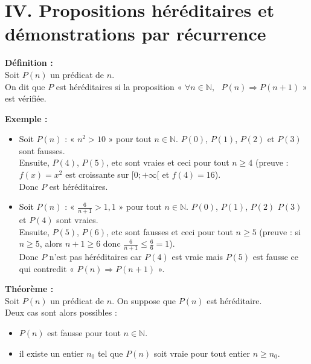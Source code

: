 \documentclass[11pt,a4paper]{article}
\begin{document}
\section*{IV. Propositions héréditaires et démonstrations par récurrence}

\begin{mdframed}[style=definitionStyle]
    \textbf{Définition :} ~\\
    Soit $P(n)$ un prédicat de $n$. \\
    On dit que $P$ est héréditaires si la proposition « $\forall n\in\mathbb{N}, \text{ } P(n)\Rightarrow P(n+1)$ » est vérifiée.	
\end{mdframed}

\textbf{Exemple :}
\begin{itemize}
  \item Soit $P(n)$ : « $n^2>10$ » pour tout $n\in\mathbb{N}$. $P(0)$, $P(1)$, $P(2)$ et $P(3)$ sont fausses. \\
  Ensuite, $P(4)$, $P(5)$, etc sont vraies et ceci pour tout $n\geq4$ (preuve : $f(x)=x^2$ est croissante sur $[0;+\infty[$ et $f(4)=16$).\\
  Donc $P$ est héréditaires.	
  \item Soit $P(n)$ : « $\frac{6}{n+1}>1,1$ » pour tout $n\in\mathbb{N}$. $P(0)$, $P(1)$, $P(2)$ $P(3)$ et $P(4)$ sont vraies.\\
  Ensuite, $P(5)$, $P(6)$, etc sont fausses et ceci pour tout $n\geq5$ (preuve : si $n\geq5$, alors $n+1\geq6$ donc $\frac{6}{n+1}\leq\frac{6}{6}=1$).\\
  Donc $P$ n'est pas héréditaires car $P(4)$ est vraie mais $P(5)$ est fausse ce qui contredit « $P(n)\Rightarrow P(n+1)$ ».
\end{itemize}

\begin{mdframed}[style=proprieteStyle]
    \textbf{Théorème :} ~\\
    Soit $P(n)$ un prédicat de $n$. On suppose que $P(n)$ est héréditaire.\\
    Deux cas sont alors possibles :
    \vspace{-4pt}
    \begin{itemize}
      \item $P(n)$ est fausse pour tout $n\in\mathbb{N}$.
      \item il existe un entier $n_0$ tel que $P(n)$ soit vraie pour tout entier $n\geq n_0$.
    \end{itemize}
\end{mdframed}
\end{document}
